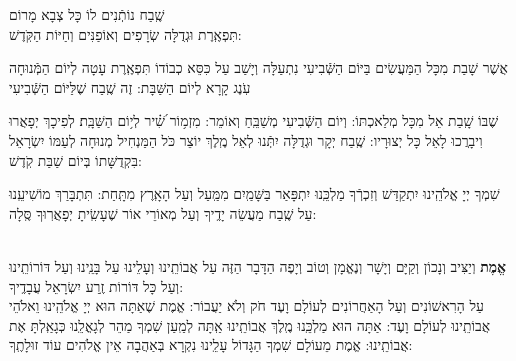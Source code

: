 \documentclass[twoside, openany, parskip=half, 11pt]{book}
\begin{document}
\shatz  שֶֽׁבַח נוֹתְֿנִים לוֹ כָּל צְבָא מָרוֹם \\
תִּפְאֶֽרֶת וּגְדֻלָּה שְׂרָפִים וְאוֹפַנִּים וְחַיּוֹת הַקֹּֽדֶשׁ:

\chazzan {}
 אֲשֶׁר שָׁבַת מִכָּל הַמַּעֲשִׂים בַּיּוֹם הַשְּֿׁבִיעִי נִתְעַלָּה וְיָשַׁב עַל כִּסֵּא כְבוֹדוֹ תִּפְאֶֽרֶת עָטָה לְיוֹם הַמְּֿנוּחָה עֹֽנֶג קָרָא לְיוֹם הַשַּׁבָּת: זֶה שֶֽׁבַח שֶׁלַּיּוֹם הַשְּֿׁבִיעִי 

\kahal
 שֶׁבּוֹ שָֽׁבַת אֵל מִכָּל מְלַאכְתּוֹ: וְיוֹם הַשְּֿׁבִיעִי מְשַׁבֵּֽחַ וְאוֹמֵר:
%
 מִזְמ֥וֹר שִׁ֝֗יר לְי֥וֹם הַשַּׁבָּֽת׃ לְפִיכָךְ יְפָאֲרוּ וִיבָרֲכוּ לָאֵל כָּל יְצוּרָיו: שֶֽׁבַח יְקָר וּגְדֻלָּה יִתְּֿנוּ לְאֵל מֶֽלֶךְ יוֹצֵר כֹּל הַמַּנְחִיל מְנוּחָה לְעַמּוֹ יִשְׂרָאֵל בִּקְדֻשָּׁתוֹ בְּיוֹם שַׁבַּת קֹֽדֶשׁ:
 
 \chazzan
  שִׁמְךָ יְיָ אֱלֹהֵֽינוּ יִתְקַדַּשׁ וְזִכְרְֿךָ מַלְכֵּֽנוּ יִתְפָּאַר בַּשָּׁמַֽיִם מִמַּֽעַל וְעַל הָאָֽרֶץ מִתָּֽחַת:
  תִּתְבָּרַךְ מוֹשִׁיעֵֽנוּ עַל שֶֽׁבַח מַעֲשֵׂה יָדֶֽיךָ וְעַל מְאוֹרֵי אוֹר שֶׁעָשִֽׂיתָ יְפָאֲרֽוּךָ סֶּֽלָה: 


\label{tisbarach}
\yotzerhameoros

\ahavaraba

\shema

\veahavta

\vehaya

\vayomer{}

 \smallskip

\begin{paracol}{2}
\\
\textbf{
אֱמֶת
}
 וְיַצִּיב וְנָכוֹן וְקַיָּם וְיָשָׁר וְנֶאֱמָן וְטוֹב וְיָפֶה הַדָּבָר הַזֶּה עַל אֲבוֹתֵֽינוּ וְעָלֵינוּ עַל בָּנֵֽינוּ וְעַל דּוֹרוֹתֵֽינוּ וְעַל כָּל דּוֹרוֹת זֶֽרַע יִשְׂרָאֵל עֲבָדֶֽיךָ:\\
 עַל הָרִאשׁוֹנִים וְעַל הָאַחֲרוֹנִים לְעוֹלָם וָעֶד חֹק וְלֹא יַעֲבוֹר: אֱמֶת שֶׁאַתָּה הוּא יְיָ אֱלֹהֵֽינוּ וֵאלֹהֵי אֲבוֹתֵֽינוּ לְעוֹלָם וָעֶד: אַתָּה הוּא מַלְכֵּֽנוּ מֶֽלֶךְ אֲבוֹתֵֽינוּ אַֽתָּה לְמַֽעַן שִׁמְךָ מַהֵר לְגָאֳלֵֽנוּ כְּגָאַֽלְתָּ אֶת אֲבוֹתֵֽינוּ: אֱמֶת מֵעוֹלָם שִׁמְךָ הַגָּדוֹל עָלֵֽינוּ נִקְרָא בְּאַהֲבָה אֵין אֱלֹהִים עוֹד זוּלָתֶֽךָ:
 	
\switchcolumn

\emesveyatziv

\end{paracol} 
 
\ezrasavoseinu

\clearpage

\gaalyisroel

\end{document}
